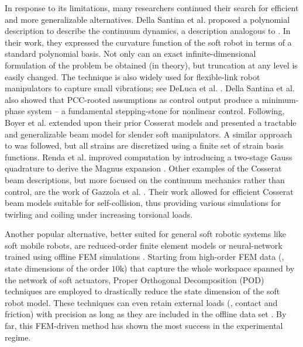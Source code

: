 In response to its limitations, many researchers continued their search for efficient and more generalizable alternatives. Della Santina et al. \cite{DellaSantina2020} proposed a polynomial description to describe the continuum dynamics, a description analogous to \cite{Chirikjian1992}. In their work, they expressed the curvature function of the soft robot in terms of a standard polynomial basis. Not only can an exact infinite-dimensional formulation of the problem be obtained (in theory), but truncation at any level is easily changed. The technique is also widely used for flexible-link robot manipulators to capture small vibrations; see DeLuca et al. \cite{DeLuca2016Jul}. Della Santina et al. also showed that PCC-rooted assumptions as control output produce a minimum-phase system \cite{DellaSantina2020} -- a fundamental stepping-stone for nonlinear control. Following, Boyer et al. \cite{Boyer2021} extended upon their prior Cosserat models \cite{Renda2018,Renda2020} and presented a tractable and generalizable beam model for slender soft manipulators. A similar approach to \cite{DellaSantina2020} was followed, but all strains are discretized using a finite set of strain basis functions. Renda et al. \cite{Renda2020} improved computation by introducing a two-stage Gauss quadrature \cite{Zanna1999} to derive the Magnus expansion \cite{Hairer2002}. Other examples of the Cosserat beam descriptions, but more focused on the continuum mechanics rather than control, are the work of Gazzola et al. \cite{Gazzola2018}. Their work allowed for efficient Cosserat beam models suitable for self-collision, thus providing various simulations for twirling and coiling under increasing torsional loads.

Another popular alternative, better suited for general soft robotic systems like soft mobile robots, are reduced-order finite element models \cite{Duriez2013,Coevoet2017,Coevoet2017Feb,Goury2018,Thieffry2017,Thieffry2020,Tonkens2021May,Katzschmann2019Apr,Wu2021Feb,Zhang2017} or neural-network trained using offline FEM simulations \cite{Fang2022Jun}. Starting from high-order FEM data (\eg, state dimensions of the order $10$k) that capture the whole workspace spanned by the network of soft actuators, Proper Orthogonal Decomposition (POD) techniques are employed to drastically reduce the state dimension of the soft robot model. These techniques can even retain external loads (\eg, contact and friction) with precision as long as they are included in the offline data set \cite{Goury2018}. By far, this FEM-driven method has shown the most success in the experimental regime.
